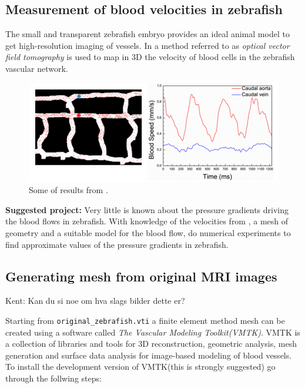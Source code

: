 \documentclass[epsfig,11pt]{article}
\begin{document}
\subsection{Measurement of blood velocities in zebrafish}

The small and transparent zebrafish embryo provides an ideal animal model to get high-resolution imaging of vessels. In \cite{fieramonti2015quantitative} a method referred to as \emph{optical vector field tomography} is used to map in 3D the velocity of blood cells in the zebrafish vascular network. 

\begin{figure}[h!] 
\begin{center}
  \includegraphics[scale=0.5]{blood_velocities.png}
  \end{center}
  \caption{Some of results from \cite{fieramonti2015quantitative}.}
\end{figure}

\textbf{Suggested project:} Very little is known about the pressure gradients driving the blood flows in zebrafish. With knowledge of the velocities from \cite{fieramonti2015quantitative}, a mesh of geometry and a suitable model for the blood flow, do numerical experiments to find approximate values of the pressure gradients in zebrafish.

\subsection{Generating mesh from original MRI images}

{\color{red} Kent: Kan du si noe om hva slags bilder dette er?}

Starting from \texttt{original\_zebrafish.vti} a finite element method mesh can be created using a software called \emph{The Vascular Modeling Toolkit(VMTK)}. VMTK is a collection of libraries and tools for 3D reconstruction, geometric analysis, mesh generation and surface data analysis for image-based modeling of blood vessels. To install the development version of VMTK(this is strongly suggested) go through the follwing steps: 
\end{document}
